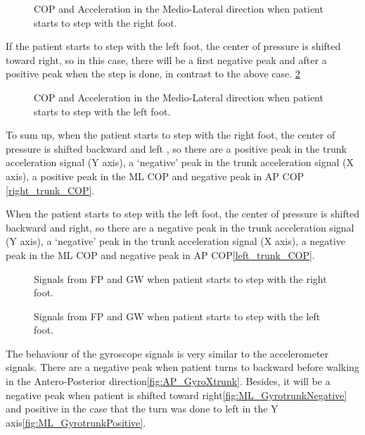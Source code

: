 \begin{figure}[H]
	\centering
	\caption{COP and Acceleration in the Medio-Lateral direction when patient starts to step with the right foot.}
	\label{fig:ML_AccYtrunkNegative}
\end{figure}

If the patient starts to step with the left foot, the center of pressure is shifted toward right, so in this case, there will be a first negative peak and after a positive peak when the step is done, in contrast to the above case. \ref{fig:ML_AccYtrunkPositive}

\begin{figure}[H]
	\centering
	\caption{COP and Acceleration in the Medio-Lateral direction when patient starts to step with the left foot.}
\label{fig:ML_AccYtrunkPositive}
\end{figure}

To sum up, when the patient starts to step with the right foot, the center of pressure  is shifted backward and left ,  so there are a positive peak in the trunk acceleration signal (Y axis), a ‘negative’ peak in the trunk acceleration signal (X axis), a positive peak in the ML COP and negative peak in AP COP \ref{right_trunk_COP}. 

When the patient starts to step with the left foot, the center of pressure is shifted backward and right, so there are a negative peak in the trunk acceleration signal (Y axis), a ‘negative’ peak in the trunk acceleration signal (X axis), a negative peak in the ML COP and negative peak in AP COP\ref{left_trunk_COP}.   
                 
\begin{figure}[H]
	\centering
	\caption{Signals from FP and GW when patient starts to step with the right foot.}
	\label{fig:right_trunk_COP}
\end{figure}

\begin{figure}[H]
	\centering
	\caption{Signals from FP and GW when patient starts to step with the left foot.}
	\label{fig:left_trunk_COP}
\end{figure}

The behaviour of the gyroscope signals is very similar to the accelerometer signals. There are a negative peak when patient turns to backward before walking in the Antero-Posterior direction\ref{fig:AP_GyroXtrunk}. Besides, it will be a negative peak when patient is shifted toward right\ref{fig:ML_GyrotrunkNegative} and positive in the case that the turn was done to left in the Y axis\ref{fig:ML_GyrotrunkPositive}.


